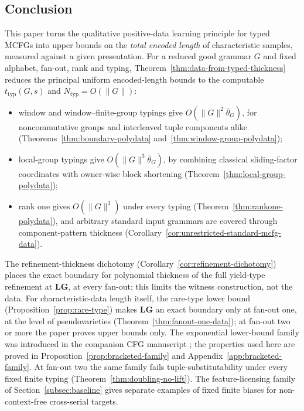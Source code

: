 \begin{remark}
\section{Conclusion}
\label{sec:conclusion}

This paper turns the qualitative positive-data learning principle for typed
MCFGs into upper bounds on the \emph{total encoded length} of characteristic
samples, measured against a given presentation.  For a reduced good grammar $G$
and fixed alphabet, fan-out, rank and typing, Theorem~\ref{thm:data-from-typed-thickness}
reduces the principal uniform encoded-length bounds to the computable
$t_{\mathrm{typ}}(G,s)$ and $N_{\mathrm{typ}}=O(\|G\|)$:
\begin{itemize}[leftmargin=*]
\item window and window--finite-group typings give $O(\|G\|^2\bar\theta_G)$, for
noncommutative groups and interleaved tuple components alike
(Theorems~\ref{thm:boundary-polydata} and~\ref{thm:window-group-polydata});
\item local-group typings give $O(\|G\|^3\bar\theta_G)$, by combining classical
sliding-factor coordinates with owner-wise block shortening
(Theorem~\ref{thm:local-group-polydata});
\item rank one gives $O(\|G\|^3)$ under every typing
(Theorem~\ref{thm:rankone-polydata}), and arbitrary standard input grammars are
covered through component-pattern thickness
(Corollary~\ref{cor:unrestricted-standard-mcfg-data}).
\end{itemize}
The refinement-thickness dichotomy (Corollary~\ref{cor:refinement-dichotomy})
places the exact boundary for polynomial thickness of the full yield-type
refinement at $\mathbf{LG}$, at every fan-out; this limits the witness
construction, not the data.  For characteristic-data length itself, the
rare-type lower bound (Proposition~\ref{prop:rare-type}) makes
$\mathbf{LG}$ an exact boundary only at fan-out one, at the level of
pseudovarieties (Theorem~\ref{thm:fanout-one-data}); at fan-out two or
more the paper proves upper bounds only. The exponential
lower-bound family was introduced in the companion CFG manuscript
\cite[Proposition~6.4]{kuriyamaCFG}; the properties used here are proved
in Proposition~\ref{prop:bracketed-family} and
Appendix~\ref{app:bracketed-family}. At fan-out two the same family fails
tuple-substitutability under every fixed finite typing
(Theorem~\ref{thm:doubling-no-lift}). The feature-licensing family of
Section~\ref{subsec:baseline} gives separate examples of fixed finite biases
for non-context-free cross-serial targets.


\end{remark}
